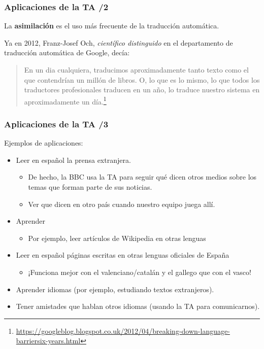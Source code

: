 \documentclass{beamer}
\begin{document}
\begin{frame}
\frametitle{Aplicaciones de la TA /2}

La \textbf{asimilación} es el uso más frecuente de la traducción automática.

Ya en 2012, Franz-Josef Och, \emph{científico distinguido} en el departamento de traducción automática de Google, decía:
\begin{quote}
En un dia cualquiera, traducimos aproximadamente tanto texto como el que contendrían un millón de libros. O, lo que es lo mismo, lo que todos los traductores profesionales traducen en un año, lo traduce nuestro sistema en aproximadamente un día.\footnote{\url{https://googleblog.blogspot.co.uk/2012/04/breaking-down-language-barriersix-years.html}}
\end{quote} 


\end{frame}

\begin{frame}
\frametitle{Aplicaciones de la TA /3}
Ejemplos de aplicaciones:\pause
\begin{itemize}
\item Leer en español la prensa extranjera.\pause
\begin{itemize}
\item De hecho, la BBC usa la TA para seguir qué dicen otros medios sobre los temas que forman parte de sus noticias.\pause
\item Ver que dicen en otro país cuando nuestro equipo juega allí.\pause
\end{itemize}
\item Aprender
\begin{itemize}
\item Por ejemplo, leer artículos de Wikipedia en otras lenguas\pause
\end{itemize}
\item Leer en español páginas escritas en otras lenguas oficiales de España\pause
\begin{itemize}
\item ¡Funciona mejor con el valenciano/catalán y el gallego que con el vasco!\pause
\end{itemize}
\item Aprender idiomas (por ejemplo, estudiando textos extranjeros).\pause
\item Tener amistades que hablan otros idiomas (usando la TA para comunicarnos).
\end{itemize}

\end{frame}
\end{document}
